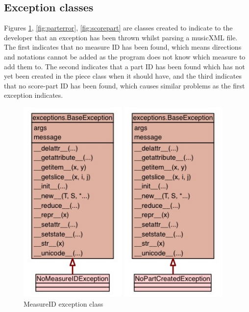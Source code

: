 \begin{appendices}
\subsection{Exception classes}
Figures \ref{fig:mid}, \ref{fig:parterror}, \ref{fig:scorepart} are classes created to indicate to the developer that an exception has been thrown whilst parsing a musicXML file. The first indicates that no measure ID has been found, which means directions and notations cannot be added as the program does not know which measure to add them to. The second indicates that a part ID has been found which has not yet been created in the piece class when it should have, and the third indicates that no score-part ID has been found, which causes similar problems as the first exception indicates.
\begin{figure}[H]
\begin{minipage}{160pt}
\includegraphics[width=150pt]{diagrams/jpegs/uml_class_diagram_for_implemen_19}	
\caption{MeasureID exception class}
\label{fig:mid}
\end{minipage}
\begin{minipage}{160pt}
\includegraphics[width=150pt]{diagrams/jpegs/uml_class_diagram_for_implemen_20}

\end{minipage}
\end{figure}
\end{appendices}
